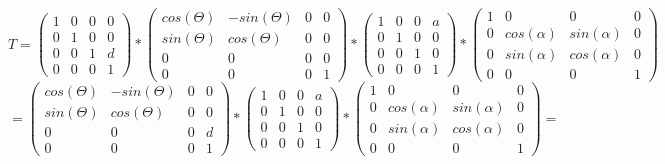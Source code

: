 \documentclass[a4paper]{article}
\begin{document}
	\begin{equation*}
		T =
		\begin{pmatrix}
			1 & 0 & 0 & 0\\
			0 & 1 & 0 & 0\\
			0 & 0 & 1 & d\\
			0 & 0 & 0 & 1
			
		\end{pmatrix}
		*
		\begin{pmatrix}
			cos(\Theta)&  -sin(\Theta)& 0 & 0\\
			sin(\Theta)&   cos(\Theta)& 0 &0 \\
			0& 0 & 0 &0 \\
			0& 0 & 0 & 1
			
		\end{pmatrix}
		*
		\begin{pmatrix}
			1 &  0&  0&a \\
			0 &  1&  0& 0\\
			0& 0 & 1 & 0\\
			0&0  &  0& 1
			
		\end{pmatrix}
		*
		\begin{pmatrix}
			1&  0&  0& 0\\
			0&  cos(\alpha) & sin(\alpha) & 0\\
			0& sin(\alpha) &   cos(\alpha)& 0\\
			0& 0 & 0 & 1
			
		\end{pmatrix}
	\end{equation*}
	\begin{equation*}
		=
		\begin{pmatrix}
			cos(\Theta)&  -sin(\Theta)& 0 & 0\\
			sin(\Theta)&   cos(\Theta)& 0 &0 \\
			0& 0 & 0 &d \\
			0& 0 & 0 & 1
			
		\end{pmatrix}
		*
		\begin{pmatrix}
			1 &  0&  0&a \\
			0 &  1&  0& 0\\
			0& 0 & 1 & 0\\
			0&0  &  0& 1
			
		\end{pmatrix}
		*
		\begin{pmatrix}
			1&  0&  0& 0\\
			0&  cos(\alpha) & sin(\alpha) & 0\\
			0& sin(\alpha) &   cos(\alpha)& 0\\
			0& 0 & 0 & 1
			
		\end{pmatrix}
		= 
	\end{equation*}
\end{document}
